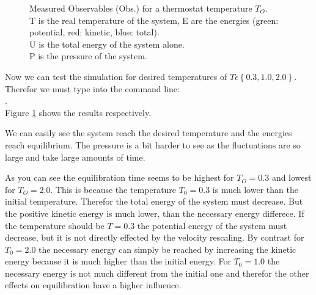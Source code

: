 \begin{figure}[ht]
\begin{subfigure}{0.3\textwidth}
\end{subfigure}

\caption{
Measured Observables (Obs.) for a thermostat temperature $T_O$.\\
T is the real temperature of the system, E are the energies (green: potential, red: kinetic, blue: total).\\
U is the total energy of the system alone.\\
P is the pressure of the system.}
\label{fig4}
\end{figure}

Now we can test the simulation for desired temperatures of  $T\epsilon\left\lbrace 0.3,1.0,2.0\right\rbrace $. 
Therefor we must type into the command line:\\

.\\


Figure \ref{fig4} shows the results respectively.

We can easily see the system reach the desired temperature and the energies reach equilibrium. The pressure is a bit harder to see as the fluctuations are so large and take large amounts of time.

As you can see the equilibration time seems to be highest for $T_O=0.3$ and lowest for $T_O=2.0$. 
This is because the temperature $T_0=0.3$ is much lower than the initial temperature. 
Therefor the total energy of the system must decrease. But the positive kinetic energy is much lower, than the necessary energy differece. 
If the temperature should be $T=0.3$ the potential energy of the system must decrease, but it is not directly effected by the velocity rescaling.
By contrast for $T_0=2.0$ the necessary energy can simply  be reached by increasing the kinetic energy because it is much higher than the initial energy.
For $T_0=1.0$ the necessary energy is not much different from the initial one and therefor the other effects on equilibration have a higher influence.